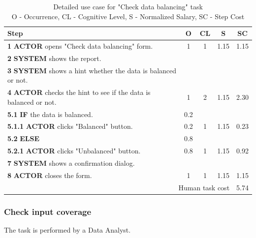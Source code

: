 \begin{table}[H]
\centering
\begin{tabularx}{\textwidth}{|X|c|c|c|c|}
\hline
\textbf{Step} & \textbf{O} & \textbf{CL} & \textbf{S} & \textbf{SC} \\
\hline
\textbf{1} \textbf{ACTOR} opens "Check data balancing" form. & 1 & 1 & 1.15 & 1.15 \\
\hline
\textbf{2} \textbf{SYSTEM} shows the report. & & & & \\
\hline
\textbf{3} \textbf{SYSTEM} shows a hint whether the data is balanced or not. & & & & \\
\hline
\textbf{4} \textbf{ACTOR} checks the hint to see if the data is balanced or not. & 1 & 2 & 1.15 & 2.30 \\
\hline
\textbf{5.1} \textbf{IF} the data is balanced. & 0.2 & & & \\
\hline
\textbf{5.1.1} \textbf{ACTOR} clicks "Balanced" button. & 0.2 & 1 & 1.15 & 0.23 \\
\hline
\textbf{5.2} \textbf{ELSE} & 0.8 & & & \\
\hline
\textbf{5.2.1} \textbf{ACTOR} clicks "Unbalanced" button. & 0.8 & 1 & 1.15 & 0.92 \\
\hline
\textbf{7} \textbf{SYSTEM} shows a confirmation dialog. & & & & \\
\hline
\textbf{8} \textbf{ACTOR} closes the form. & 1 & 1 & 1.15 & 1.15 \\
\hline
\multicolumn{4}{|r|}{Human task cost} & 5.74 \\
\hline
\end{tabularx}
\caption{Detailed use case for "Check data balancing" task\\ 
 O - Occurrence, CL - Cognitive Level, S - Normalized Salary, SC - Step Cost}
\label{table:check_data_balancing}
\end{table}

\subsubsection{Check input coverage}

The task is performed by a Data Analyst.

